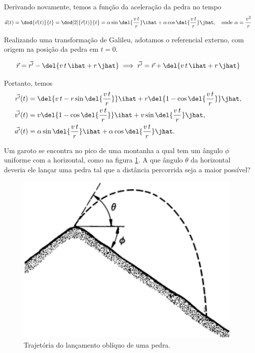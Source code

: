 \documentclass[]{IMTexam}
\begin{document}
\begin{questions}
\begin{solution}
		Derivando novamente, temos a função da aceleração da pedra no tempo
		\[ \vec{a}(t)=\dod{\vec{v}(t)}{t}=\dod[2]{\vec{r}(t)}{t}=\alpha\sin\del{\dfrac{v\,t}{r}}\ihat+\alpha\cos\del{\dfrac{v\,t}{r}}\jhat,\quad\textup{onde }\alpha=\dfrac{v^{2}}{r} \]

		\begin{multi}
			Realizando uma transformação de Galileu, adotamos o referencial externo, com origem na posição da pedra em $ t=0 $.

			\[ \vec{r}=\vec{r'}-\del{v\,t\,\ihat+r\,\jhat}\implies \vec{r'}=\vec{r}+\del{v\,t\,\ihat+r\,\jhat} \]
			\nextcol
			\centering
		\end{multi}

		Portanto, temos
		\begin{align*}
			\vec{r'}(t) & =\del{v\,t-r\sin\del{\dfrac{v\,t}{r}}}\ihat+r\del{1-\cos\del{\dfrac{v\,t}{r}}}\jhat, \\
			\vec{v'}(t) & =v\del{1-\cos\del{\dfrac{v\,t}{r}}}\ihat+v\sin\del{\dfrac{v\,t}{r}}\jhat,            \\
			\vec{a'}(t) & =\alpha\sin\del{\dfrac{v\,t}{r}}\ihat+\alpha\cos\del{\dfrac{v\,t}{r}}\jhat.
		\end{align*}
	\end{solution}

	\question Um garoto se encontra no pico de uma montanha a qual tem um ângulo $\phi$ uniforme com a horizontal, como na figura \ref{fig:fig4}. A que ângulo $\theta$ da horizontal deveria ele lançar uma pedra tal que a distância percorrida seja a maior possível?

	\begin{figure}[H]
		\centering
		\includegraphics[width=0.4\linewidth]{screenshot001}
		\caption{Trajetória do lançamento oblíquo de uma pedra.}
		\label{fig:fig4}
	\end{figure}


\end{questions}
\end{document}
